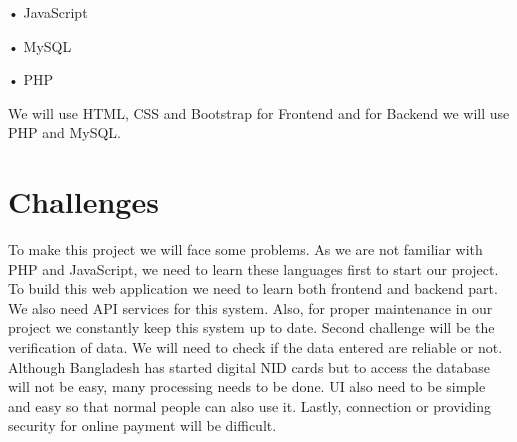 \documentclass[12pt]{article}
\begin{document}
•	JavaScript

•	MySQL

•	PHP

We will use HTML, CSS and Bootstrap for Frontend and for Backend we will use PHP and MySQL. 

\section*{Challenges}
To make this project we will face some problems. As we are not familiar with PHP and JavaScript, we need to learn these languages first to start our project. To build this web application we need to learn both frontend and backend part. We also need API services for this system. Also, for proper maintenance in our project we constantly keep this system up to date. Second challenge will be the verification of data. We will need to check if the data entered are reliable or not. Although Bangladesh has started digital NID cards but to access the database will not be easy, many processing needs to be done. UI also need to be simple and easy so that normal people can also use it. Lastly, connection or providing security for online payment will be difficult.


\pagebreak

\printbibliography %
\end{document}

